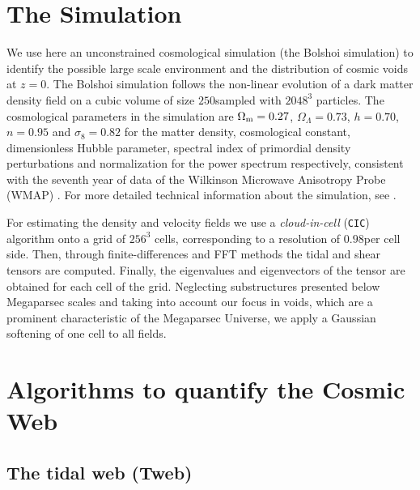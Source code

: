 \documentclass[a4,useAMS,usenatbib,usegraphicx]{latex/mn2e}
\begin{document}
\section{The Simulation}
\label{sec:the_simulation}


We use here an unconstrained cosmological simulation (the Bolshoi 
simulation) to identify the possible large scale environment and the 
distribution of cosmic voids at $z=0$. The Bolshoi simulation follows the 
non-linear evolution of a dark matter density field on a cubic volume of 
size $250$\hMpc sampled with $2048^3$ particles. The cosmological 
parameters in the simulation are $\Omega_{\rm m}=0.27$, $\Omega_{\Lambda}
=0.73$, $h=0.70$, $n=0.95$ and $\sigma_{8}=0.82$ for the matter density, 
cosmological constant, dimensionless Hubble parameter, spectral index of 
primordial density perturbations and normalization for the power spectrum
respectively, consistent with the seventh year of data of the Wilkinson 
Microwave Anisotropy Probe (WMAP) \citep{Jarosik11}. For more detailed 
technical information about the simulation, see \citet{Klypin11}.


For estimating the density and velocity fields we use a 
\textit{cloud-in-cell} (\texttt{CIC}) algorithm onto a grid of $256^3$ 
cells, corresponding to a resolution of $0.98$\hMpc per cell side. Then, 
through finite-differences and FFT methods the tidal and shear tensors 
are computed. Finally, the eigenvalues and eigenvectors of the tensor are
obtained for each cell of the grid. Neglecting substructures presented 
below Megaparsec scales and taking into account our focus in voids, which
are a prominent characteristic of the Megaparsec Universe, we apply a 
Gaussian softening of one cell to all fields.



\section{Algorithms to quantify the Cosmic Web}
\label{sec:algorithms_cosmic_web}


\subsection{The tidal web (Tweb)}
\label{subsec:Tweb}
\end{document}
